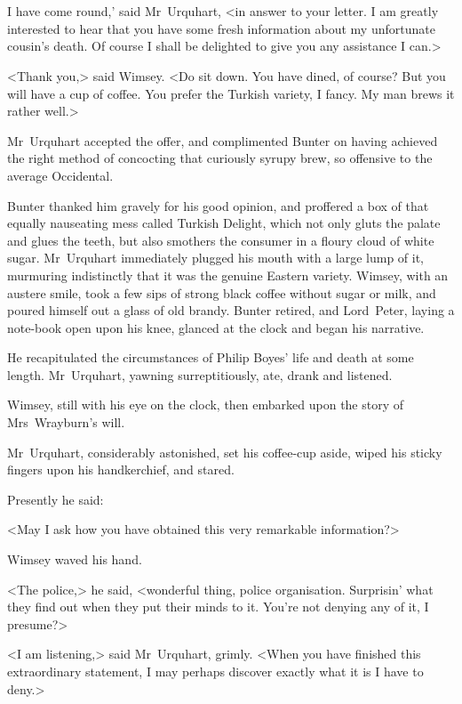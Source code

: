 \chapter[Chapter \thechapter]{}
\lettrine[ante=`]{I}{} have come round,' said Mr~Urquhart, <in answer to your letter. I am greatly interested to hear that you have some fresh information about my unfortunate cousin's death. Of course I shall be delighted to give you any assistance I can.>

<Thank you,> said Wimsey. <Do sit down. You have dined, of course? But you will have a cup of coffee. You prefer the Turkish variety, I fancy. My man brews it rather well.>

Mr~Urquhart accepted the offer, and complimented Bunter on having achieved the right method of concocting that curiously syrupy brew, so offensive to the average Occidental.

Bunter thanked him gravely for his good opinion, and proffered a box of that equally nauseating mess called Turkish Delight, which not only gluts the palate and glues the teeth, but also smothers the consumer in a floury cloud of white sugar. Mr~Urquhart immediately plugged his mouth with a large lump of it, murmuring indistinctly that it was the genuine Eastern variety. Wimsey, with an austere smile, took a few sips of strong black coffee without sugar or milk, and poured himself out a glass of old brandy. Bunter retired, and Lord~Peter, laying a note-book open upon his knee, glanced at the clock and began his narrative.

He recapitulated the circumstances of Philip Boyes' life and death at some length. Mr~Urquhart, yawning surreptitiously, ate, drank and listened.

Wimsey, still with his eye on the clock, then embarked upon the story of Mrs~Wrayburn's will.

Mr~Urquhart, considerably astonished, set his coffee-cup aside, wiped his sticky fingers upon his handkerchief, and stared.

Presently he said:

<May I ask how you have obtained this very remarkable information?>

Wimsey waved his hand.

<The police,> he said, <wonderful thing, police organisation. Surprisin' what they find out when they put their minds to it. You're not denying any of it, I presume?>

<I am listening,> said Mr~Urquhart, grimly. <When you have finished this extraordinary statement, I may perhaps discover exactly what it is I have to deny.>

